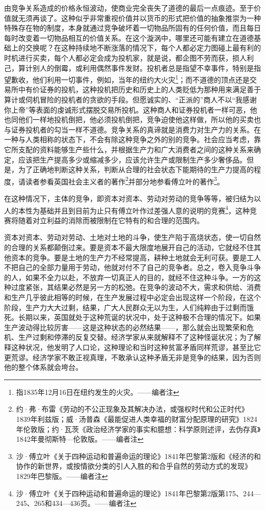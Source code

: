 \documentclass[a4paper,twoside,12pt]{ctexart}
\begin{document}
由竞争关系造成的价格永恒波动，使商业完全丧失了道德的最后一点痕迹。至于价值就无须再谈了。这种似乎非常重视价值并以货币的形式把价值的抽象推崇为一种特殊存在物的制度，本身就通过竞争破坏着一切物品所固有的任何价值，而且每日每时改变着一切物品相互的价值关系。在这个漩涡中，哪里还可能有建立在道德基础上的交换呢？在这种持续地不断涨落的情况下，每个人都必定力图碰上最有利的时机进行买卖，每个人都必定会成为投机家，就是说，都企图不劳而获，损人利己，算计别人的倒霉，或利用偶然事件发财。投机者总是指望不幸事件，特别是指望歉收，他们利用一切事件，例如，当年的纽约大火灾\footnote{指1835年12月16日在纽约发生的火灾。——编者注 }；而不道德的顶点还是交易所中有价证券的投机，这种投机把历史和历史上的人类贬低为那种用来满足善于算计或伺机冒险的投机者的贪欲的手段。但愿诚实的、“正派的”商人不以“我感谢你上帝”等表面的虔诚形式摆脱交易所投机。这种商人和证券投机者一样可恶，他也同他们一样地投机倒把，他必须投机倒把，竞争迫使他这样做，所以他的买卖也与证券投机者的勾当一样不道德。竞争关系的真谛就是消费力对生产力的关系。在一种与人类相称的状态下，不会有除这种竞争之外的别的竞争。社会应当考虑，靠它所支配的资料能够生产些什么，并根据生产力和广大消费者之间的这种关系来确定，应该把生产提高多少或缩减多少，应该允许生产或限制生产多少奢侈品。但是，为了正确地判断这种关系，判断从合理的社会状态下能期待的生产力提高的程度，请读者参看英国社会主义者的著作\footnote{约·弗·布雷《劳动的不公正现象及其解决办法，或强权时代和公正时代》1839年利兹版；威·汤普森《最能促进人类幸福的财富分配原理的研究》1824年伦敦版；约·瓦茨《政治经济学家的事实和臆想：科学原则述评，去伪存真》1842年曼彻斯特—伦敦版。——编者注}并部分地参看傅立叶的著作\footnote{沙·傅立叶《关于四种运动和普遍命运的理论》1841年巴黎第2版和《经济的和协作的新世界，或按情欲分类的引人入胜的和合乎自然的劳动方式的发现》1829年巴黎版。——编者注}。

在这种情况下，主体的竞争，即资本对资本、劳动对劳动的竞争等等，被归结为以人的本性为基础并且到目前为止只有傅立叶作过差强人意的说明的竞赛\footnote{沙·傅立叶《关于四种运动和普遍命运的理论》1841年巴黎第2版第175、244—245、265和434—436页。——编者注}，这种竞赛将随着对立利益的消除而被限制在它特有的和合理的范围内。

资本对资本、劳动对劳动、土地对土地的斗争，使生产陷于高烧状态，使一切自然的合理的关系都颠倒过来。要是资本不最大限度地展开自己的活动，它就经不住其他资本的竞争。要是土地的生产力不经常提高，耕种土地就会无利可获。要是工人不把自己的全部力量用于劳动，他就对付不了自己的竞争者。总之，卷入竞争斗争的人，如果不全力以赴，不放弃一切真正人的目的，就经不住这种斗争。一方的这种过度紧张，其结果必然是另一方的松弛。在竞争的波动不大，需求和供给、消费和生产几乎彼此相等的时候，在生产发展过程中必定会出现这样一个阶段，在这个阶段，生产力大大过剩，结果，广大人民群众无以为生，人们纯粹由于过剩而饿死。长期以来，英国就处于这种荒诞的状况中，处于这种极不合理的情况下。如果生产波动得比较厉害——这是这种状态的必然结果——，那么就会出现繁荣和危机、生产过剩和停滞的反复交替。经济学家从来就解释不了这种怪诞状况；为了解释这种状况，他发明了人口论，这种理论和当时这种贫富矛盾同样荒谬，甚至比它更荒谬。经济学家不敢正视真理，不敢承认这种矛盾无非是竞争的结果，因为否则他的整个体系就会垮台。
\end{document}
